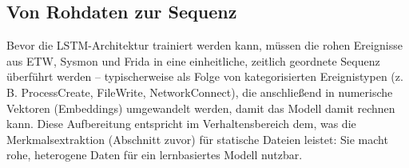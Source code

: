 \subsection{Von Rohdaten zur Sequenz}

Bevor die \ac{LSTM}-Architektur trainiert werden kann, müssen die
rohen Ereignisse aus \ac{ETW}, \ac{Sysmon} und Frida in eine
einheitliche, zeitlich geordnete Sequenz überführt werden --
typischerweise als Folge von kategorisierten Ereignistypen (z.\,B.
ProcessCreate, FileWrite, NetworkConnect), die anschließend in
numerische Vektoren (Embeddings) umgewandelt werden, damit das Modell
damit rechnen kann. Diese Aufbereitung entspricht im Verhaltensbereich
dem, was die Merkmalsextraktion (Abschnitt zuvor) für statische Dateien
leistet: Sie macht rohe, heterogene Daten für ein lernbasiertes Modell
nutzbar.